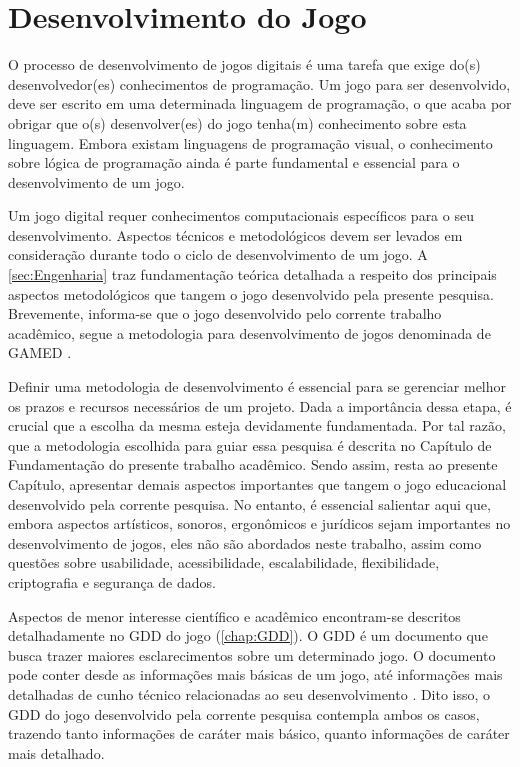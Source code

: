 \chapter{Desenvolvimento do Jogo}\label{ch:Desenvolvimento}

O processo de desenvolvimento de jogos digitais é uma tarefa que exige do(s) desenvolvedor(es) conhecimentos de programação. Um jogo para ser desenvolvido, deve ser escrito em uma determinada linguagem de programação, o que acaba por obrigar que o(s) desenvolver(es) do jogo tenha(m) conhecimento sobre esta linguagem. Embora existam linguagens de programação visual, o conhecimento sobre lógica de programação ainda é parte fundamental e essencial para o desenvolvimento de um jogo. 

Um jogo digital requer conhecimentos computacionais específicos para o seu desenvolvimento. Aspectos técnicos e metodológicos devem ser levados em consideração durante todo o ciclo de desenvolvimento de um jogo. A \autoref{sec:Engenharia} traz fundamentação teórica detalhada a respeito dos principais aspectos metodológicos que tangem o jogo desenvolvido pela presente pesquisa. Brevemente, informa-se que o jogo desenvolvido pelo corrente trabalho acadêmico, segue a metodologia para desenvolvimento de jogos denominada de \ac{GAMED} \cite{aslan2016digital}. 

Definir uma metodologia de desenvolvimento é essencial para se gerenciar melhor os prazos e recursos necessários de um projeto. Dada a importância dessa etapa, é crucial que a escolha da mesma esteja devidamente fundamentada. Por tal razão, que a metodologia escolhida para guiar essa pesquisa é descrita no Capítulo de Fundamentação do presente trabalho acadêmico. Sendo assim, resta ao presente Capítulo, apresentar demais aspectos importantes que tangem o jogo educacional desenvolvido pela corrente pesquisa. No entanto, é essencial salientar aqui que, embora aspectos artísticos, sonoros, ergonômicos e jurídicos sejam importantes no desenvolvimento de jogos, eles não são abordados neste trabalho, assim como questões sobre usabilidade, acessibilidade, escalabilidade, flexibilidade, criptografia e segurança de dados.

Aspectos de menor interesse científico e acadêmico encontram-se descritos detalhadamente no \ac{GDD} do jogo (\autoref{chap:GDD}). O \ac{GDD} é um documento que busca trazer maiores esclarecimentos sobre um determinado jogo. O documento pode conter desde as informações mais básicas de um jogo, até informações mais detalhadas de cunho técnico relacionadas ao seu desenvolvimento \cite{motta2013short}. Dito isso, o \ac{GDD} do jogo desenvolvido pela corrente pesquisa contempla ambos os casos, trazendo tanto informações de caráter mais básico, quanto informações de caráter mais detalhado.

